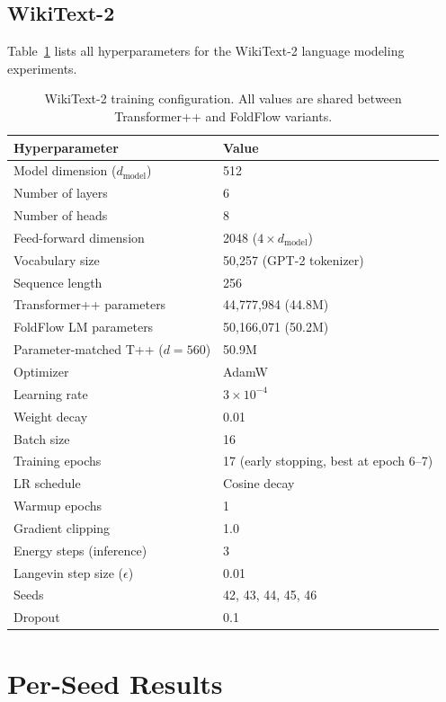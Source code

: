 \documentclass[10pt]{article}
\begin{document}
\subsection{WikiText-2}

Table~\ref{tab:wt2_config} lists all hyperparameters for the WikiText-2
language modeling experiments.

\begin{table}[h]
\centering
\caption{WikiText-2 training configuration.  All values are shared
  between Transformer++ and FoldFlow variants.}
\label{tab:wt2_config}
\small
\begin{tabular}{@{}ll@{}}
\toprule
Hyperparameter & Value \\
\midrule
Model dimension ($d_\text{model}$) & 512 \\
Number of layers & 6 \\
Number of heads & 8 \\
Feed-forward dimension & 2048 ($4 \times d_\text{model}$) \\
Vocabulary size & 50,257 (GPT-2 tokenizer) \\
Sequence length & 256 \\
\midrule
Transformer++ parameters & 44,777,984 (44.8M) \\
FoldFlow LM parameters & 50,166,071 (50.2M) \\
Parameter-matched T++ ($d{=}560$) & 50.9M \\
\midrule
Optimizer & AdamW \\
Learning rate & $3 \times 10^{-4}$ \\
Weight decay & 0.01 \\
Batch size & 16 \\
Training epochs & 17 (early stopping, best at epoch 6--7) \\
LR schedule & Cosine decay \\
Warmup epochs & 1 \\
Gradient clipping & 1.0 \\
\midrule
Energy steps (inference) & 3 \\
Langevin step size ($\epsilon$) & 0.01 \\
Seeds & 42, 43, 44, 45, 46 \\
Dropout & 0.1 \\
\bottomrule
\end{tabular}
\end{table}

\section{Per-Seed Results}
\label{app:per_seed}
\end{document}

